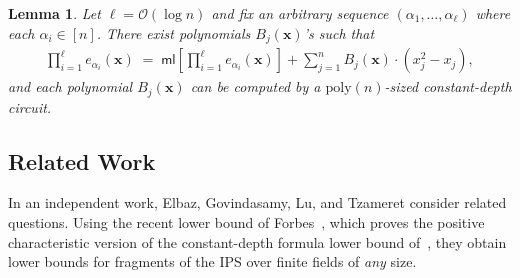 \documentclass[11pt]{article}
\newtheorem{lemma}[theorem]{Lemma}
\newtheorem{definition}[theorem]{Definition}
\newcommand{\Boo}{\{0,1 \}}
\newcommand{\bigO}{\mathcal{O}}
\newcommand{\brac}[1]{\left[ #1 \right]}
\newcommand{\F}{\mathbb{F}}
\renewcommand{\comment}[2]{\marginpar{\tiny{\textbf{#1: }\textit{#2}}}}
\newcommand{\anote}[1]{\comment{AB}{#1}}
\newcommand{\ssr}[1]{\comment{SS}{#1}}
\newcommand{\IPS}{\mathrm{IPS}}
\newcommand{\ml}{\mathsf{ml}}
\begin{document}
\begin{lemma}
Let $\ell = \bigO(\log n)$ and fix an arbitrary sequence $(\alpha_{1},\ldots,\alpha_{\ell})$ where each $\alpha_{i} \in [n]$. There exist polynomials $B_{j}(\mathbf{x})$'s such that
\begin{align*}
    \prod_{i = 1}^{\ell} e_{\alpha_{i}}(\mathbf{x}) \; = \; \ml\brac{\prod_{i = 1}^{\ell} e_{\alpha_{i}}(\mathbf{x})} + \sum_{j=1}^{n} B_{j}(\mathbf{x}) \cdot (x_{j}^{2} - x_{j}),
\end{align*}
and each polynomial $B_{j}(\mathbf{x})$ can be computed by a $\mathrm{poly}(n)$-sized constant-depth circuit. 
\end{lemma}


\subsection{Related Work}
\label{sec:related}
In an independent work, Elbaz, Govindasamy, Lu, and Tzameret \cite{EGLT-25} consider related questions. Using the recent lower bound of Forbes~\cite{Forbes-LST-CCC}, which proves the positive characteristic version of the constant-depth formula lower bound of~\cite{LST}, they obtain lower bounds for fragments of the IPS over finite fields of \emph{any} size.











\end{document}
